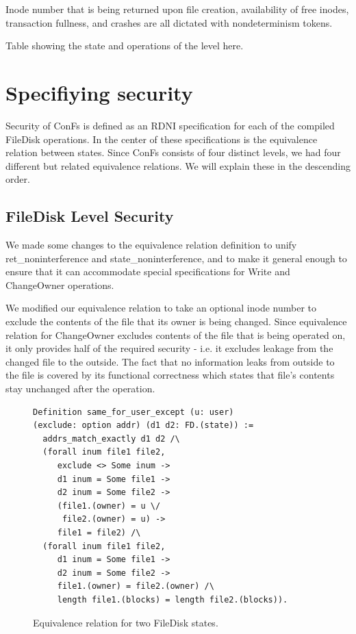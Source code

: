 Inode number that is being returned upon file creation, availability of free inodes, transaction fullness, and crashes are all dictated with nondeterminism tokens.

{\color{red} Table showing the state and operations of the level here}.

\section{Specifiying security}
Security of ConFs is defined as an RDNI specification for each of the compiled FileDisk operations. In the center of these specifications is the equivalence relation between states. Since ConFs consists of four distinct levels, we had four different but related equivalence relations. We will explain these in the descending order.

\subsection{FileDisk Level Security}
We made some changes to the equivalence relation definition to unify ret\_noninterference and state\_noninterference, and to make it general enough to ensure that it can accommodate special specifications for Write and ChangeOwner operations.

We modified our equivalence relation to take an optional inode number to exclude the contents of the file that its owner is being changed.
Since equivalence relation for ChangeOwner excludes contents of the file that is being operated on, it only provides half of the required security - i.e. it excludes leakage from the changed file to the outside. The fact that no information leaks from outside to the file is covered by its functional correctness which states that file's contents stay unchanged after the operation.

\begin{figure}[ht]
    \centering
\begin{verbatim}
Definition same_for_user_except (u: user) 
(exclude: option addr) (d1 d2: FD.(state)) :=
  addrs_match_exactly d1 d2 /\
  (forall inum file1 file2,
     exclude <> Some inum ->
     d1 inum = Some file1 ->
     d2 inum = Some file2 ->
     (file1.(owner) = u \/
      file2.(owner) = u) ->
     file1 = file2) /\
  (forall inum file1 file2,
     d1 inum = Some file1 ->
     d2 inum = Some file2 ->
     file1.(owner) = file2.(owner) /\ 
     length file1.(blocks) = length file2.(blocks)).
\end{verbatim}
    \caption{Equivalence relation for two FileDisk states.}
    \label{fig:eqivalence_for_filedisk}
\end{figure}


